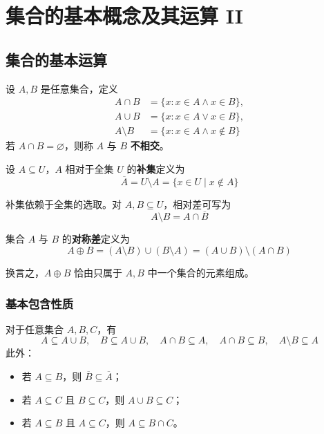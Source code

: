 \section{集合的基本概念及其运算 II}

\subsection{集合的基本运算}

\begin{definition}[交、并与差]
	设 $A, B$ 是任意集合，定义
	\begin{align*}
		A \cap B & = \{x: x \in A \land x \in B\}, \\
		A \cup B & = \{x: x \in A \lor x \in B\}, \\
		A \setminus B & = \{x: x \in A \land x \notin B\}
	\end{align*}
	若 $A \cap B = \varnothing$，则称 $A$ 与 $B$ \textbf{不相交}。
\end{definition}

\begin{definition}[补集]
	设 $A \subseteq U$，$A$ 相对于全集 $U$ 的\textbf{补集}定义为
	$$
	\overline{A} = U \setminus A = \{x \in U \mid x \notin A\}
	$$
\end{definition}

补集依赖于全集的选取。对 $A, B \subseteq U$，相对差可写为
$$
A \setminus B = A \cap \overline{B}
$$

\begin{definition}[对称差]
	集合 $A$ 与 $B$ 的\textbf{对称差}定义为
	$$
	A \oplus B = (A \setminus B) \cup (B \setminus A) = (A \cup B) \setminus (A \cap B)
	$$
\end{definition}

换言之，$A \oplus B$ 恰由只属于 $A, B$ 中一个集合的元素组成。

\subsubsection{基本包含性质}

对于任意集合 $A, B, C$，有
$$
A \subseteq A \cup B, \quad B \subseteq A \cup B, \quad A \cap B \subseteq A, \quad A \cap B \subseteq B, \quad A \setminus B \subseteq A
$$
此外：
\begin{itemize}
	\item 若 $A \subseteq B$，则 $\overline{B} \subseteq \overline{A}$；
	\item 若 $A \subseteq C$ 且 $B \subseteq C$，则 $A \cup B \subseteq C$；
	\item 若 $A \subseteq B$ 且 $A \subseteq C$，则 $A \subseteq B \cap C$。
\end{itemize}


